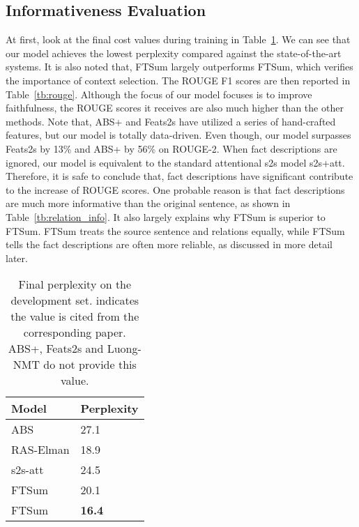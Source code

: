 \documentclass[letterpaper]{article} \usepackage{aaai18}  \usepackage{times}  \usepackage{helvet}  \usepackage{courier}  \usepackage{url}  \usepackage{graphicx}  \usepackage{amsfonts}
\begin{document}
	\subsection{Informativeness Evaluation}
	At first, look at the final cost values during training in Table~\ref{tb:ppl}.
	We can see that our model achieves the lowest perplexity compared against the state-of-the-art systems.
	It is also noted that, FTSum largely outperforms FTSum, which verifies the importance of context selection.
	The ROUGE F1 scores are then reported in Table~\ref{tb:rouge}.
	Although the focus of our model focuses is to improve faithfulness, the ROUGE scores it receives are also much higher than the other methods.
	Note that, ABS+ and Feats2s have utilized a series of hand-crafted features, but our model is totally data-driven.
	Even though, our model surpasses Feats2s by 13\% and ABS+ by 56\% on ROUGE-2.
	When fact descriptions are ignored, our model is equivalent to the standard attentional s2s model s2s+att.
	Therefore, it is safe to conclude that, fact descriptions have significant contribute to the increase of ROUGE scores.
One probable reason is that fact descriptions are much more informative than the original sentence, as shown in Table~\ref{tb:relation_info}.
	It also largely explains why FTSum is superior to FTSum.
	FTSum treats the source sentence and relations equally, while FTSum tells the fact descriptions are often more reliable, as discussed in more detail later.
	
	\begin{table}
		\centering
		\begin{tabular}{l|l}
			\hline
			Model     & Perplexity \\ \hline
			ABS       & 27.1       \\
			RAS-Elman & 18.9       \\
			s2s-att   & 24.5       \\
			FTSum     & 20.1       \\
			FTSum     & \textbf{16.4}       \\ \hline
		\end{tabular}
		\caption{Final perplexity on the development set.  indicates the value is cited from the corresponding paper. ABS+, Feats2s and Luong-NMT do not provide this value.}
		\label{tb:ppl}
	\end{table}
	
\end{document}
